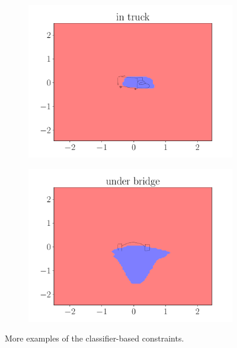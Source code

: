\begin{figure}[ht]
\begin{subfigure}{0.45\textwidth}
            \includegraphics[width=\textwidth]{figures/in_truck.pdf}
        \end{subfigure}
        \begin{subfigure}{0.45\textwidth}
            \centering
            \includegraphics[width=\textwidth]{figures/under_bridge.pdf}
        \end{subfigure}
    \caption[More examples of the classifier-based constraints]{More examples of the classifier-based constraints.}
    \label{fig:boundaries:5}
\end{figure}

